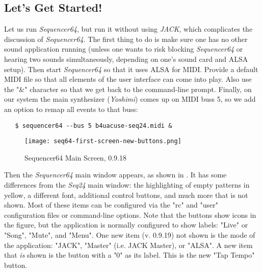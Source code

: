 \documentclass[
 11pt,
 twoside,
 a4paper,
 headinclude,
 footinclude,
 final                                 %
]{article}
\begin{document}
\subsection{Let's Get Started!}
\label{subsec:introduction_lets_get_started}

   Let us run \textsl{Sequencer64}, but run it without using \textsl{JACK},
   which complicates the discussion of \textsl{Sequencer64}.  The first
   thing to do is make sure one has no other sound application running
   (unless one wants to risk blocking \textsl{Sequencer64} or hearing two
    sounds simultaneously, depending on one's sound card and ALSA setup).
   Then start \textsl{Sequencer64} so that it uses ALSA for MIDI.  Provide a
   default MIDI file so that all elements of the user interface can come
   into play.  Also use the "\&" character so that we get back to the
   command-line prompt.  Finally, on our system the main synthesizer
   (\textsl{Yoshimi}) comes up on MIDI buss 5, so we add an option to remap
   all events to that buss:

\begin{verbatim}
   $ sequencer64 --bus 5 b4uacuse-seq24.midi &
\end{verbatim}

\begin{figure}[H]
   \centering 
   \texttt{[image: seq64-first-screen-new-buttons.png]}
   \caption{Sequencer64 Main Screen, 0.9.18}
   \label{fig:seq64_main_screen}
\end{figure}

   Then the \textsl{Sequencer64} main window appears, as shown in
   .  It has some differences
   from the \textsl{Seq24} main window: the highlighting of
   empty patterns in yellow, a different font, additional control buttons,
   and much more that is not shown.
   Most of these items can be configured via the "rc" and "user" configuration
   files or command-line options.
   Note that the buttons show icons in the figure, but the application is
   normally configured to show labels:  "Live" or "Song", "Mute", and "Menu".
   One new item (v. 0.9.19) not shown is the mode of the application:
   "JACK", "Master" (i.e. JACK Master), or "ALSA".
   A new item that \textsl{is} shown is the button with a "0" as its label.
   This is the new "Tap Tempo" button.

\end{document}
